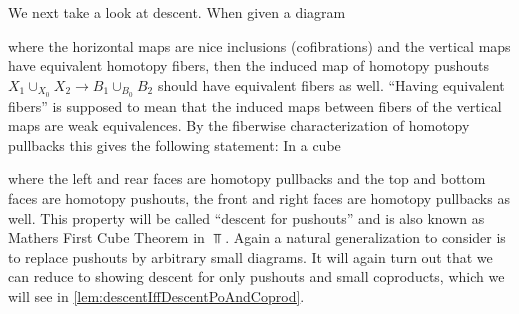 We next take a look at descent.
When given a diagram 
\begin{center}
\end{center}
where the horizontal maps are nice inclusions (cofibrations) and the vertical maps have equivalent homotopy fibers, then the induced map of homotopy pushouts $X_1\cup_{X_{0}}X_2\to B_1\cup_{B_{0}}B_2$ should have equivalent fibers as well.
``Having equivalent fibers'' is supposed to mean that the induced maps between fibers of the vertical maps are weak equivalences.
By the fiberwise characterization of homotopy pullbacks this gives the following statement:
In a cube 
\begin{center}
\end{center}
where the left and rear faces are homotopy pullbacks and the top and bottom faces are homotopy pushouts, the front and right faces are homotopy pullbacks as well.
This property will be called ``descent for pushouts'' and is also known as Mathers First Cube Theorem in $\Top$.
Again a natural generalization to consider is to replace pushouts by arbitrary small diagrams.
It will again turn out that we can reduce to showing descent for only pushouts and small coproducts, which we will see in \cref{lem:descentIffDescentPoAndCoprod}.